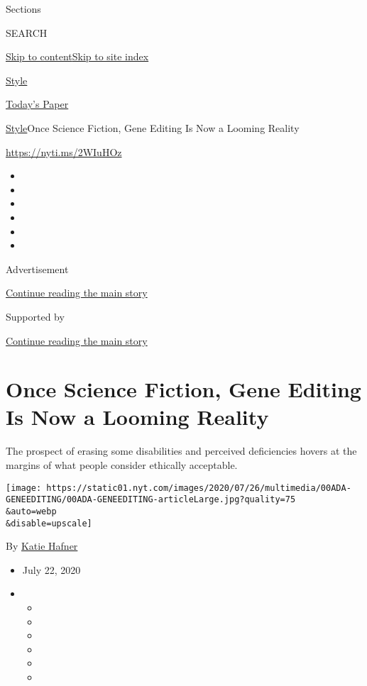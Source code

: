 Sections

SEARCH

\protect\hyperlink{site-content}{Skip to
content}\protect\hyperlink{site-index}{Skip to site index}

\href{https://www.nytimes.com/section/style}{Style}

\href{https://myaccount.nytimes.com/auth/login?response_type=cookie\&client_id=vi}{}

\href{https://www.nytimes.com/section/todayspaper}{Today's Paper}

\href{/section/style}{Style}\textbar{}Once Science Fiction, Gene Editing
Is Now a Looming Reality

\href{https://nyti.ms/2WIuHOz}{https://nyti.ms/2WIuHOz}

\begin{itemize}
\item
\item
\item
\item
\item
\item
\end{itemize}

Advertisement

\protect\hyperlink{after-top}{Continue reading the main story}

Supported by

\protect\hyperlink{after-sponsor}{Continue reading the main story}

\hypertarget{once-science-fiction-gene-editing-is-now-a-looming-reality}{%
\section{Once Science Fiction, Gene Editing Is Now a Looming
Reality}\label{once-science-fiction-gene-editing-is-now-a-looming-reality}}

The prospect of erasing some disabilities and perceived deficiencies
hovers at the margins of what people consider ethically acceptable.

\texttt{[image: https://static01.nyt.com/images/2020/07/26/multimedia/00ADA-GENEEDITING/00ADA-GENEEDITING-articleLarge.jpg?quality=75\\\&auto=webp\\\&disable=upscale]}

By \href{https://www.nytimes.com/by/katie-hafner}{Katie Hafner}

\begin{itemize}
\item
  July 22, 2020
\item
  \begin{itemize}
  \item
  \item
  \item
  \item
  \item
  \item
  \end{itemize}
\end{itemize}

